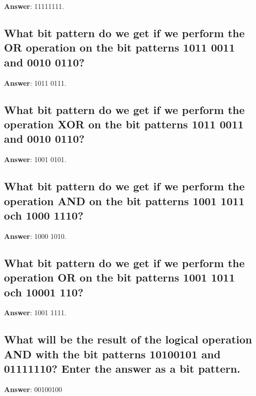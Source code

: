 \documentclass[a4paper,11pt,oneside]{article}
\begin{document}
\begin{sloppypar}
\label{q:404:sa:en:True}

\textbf{Answer}: 11111111.



\subsection{What bit pattern do we get if we perform the OR operation on the bit patterns 1011 0011 and 0010 0110?}

\label{q:405:sa:en:True}

\textbf{Answer}: 1011 0111.



\subsection{What bit pattern do we get if we perform the operation XOR on the bit patterns 1011 0011 and 0010 0110?}

\label{q:406:sa:en:True}

\textbf{Answer}: 1001 0101.



\subsection{What bit pattern do we get if we perform the operation AND on the bit patterns 1001 1011 och 1000 1110?}

\label{q:407:sa:en:True}

\textbf{Answer}: 1000 1010.



\subsection{What bit pattern do we get if we perform the operation OR on the bit patterns 1001 1011 och 10001 110?}

\label{q:408:sa:en:True}

\textbf{Answer}: 1001 1111.



\subsection{What will be the result of the logical operation AND with the bit patterns 10100101 and 01111110? Enter the answer as a bit pattern.}

\label{q:409:sa:en:True}

\textbf{Answer}: 00100100




\end{sloppypar}
\end{document}
